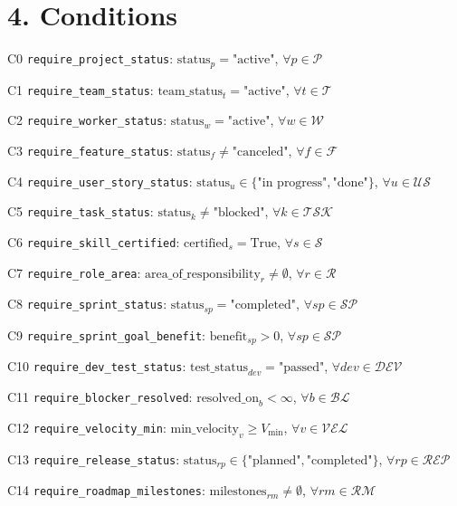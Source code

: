 \documentclass[12pt]{article}
\begin{document}
\section{4. Conditions}
\item[C0] \texttt{require\_project\_status}: $\text{status}_p = \text{"active"}$, $\forall p \in \mathcal{P}$
    \item[C1] \texttt{require\_team\_status}: $\text{team\_status}_t = \text{"active"}$, $\forall t \in \mathcal{T}$
    \item[C2] \texttt{require\_worker\_status}: $\text{status}_w = \text{"active"}$, $\forall w \in \mathcal{W}$
    \item[C3] \texttt{require\_feature\_status}: $\text{status}_f \neq \text{"canceled"}$, $\forall f \in \mathcal{F}$
    \item[C4] \texttt{require\_user\_story\_status}: $\text{status}_u \in \{\text{"in progress"}, \text{"done"}\}$, $\forall u \in \mathcal{US}$
    \item[C5] \texttt{require\_task\_status}: $\text{status}_k \neq \text{"blocked"}$, $\forall k \in \mathcal{TSK}$
    \item[C6] \texttt{require\_skill\_certified}: $\text{certified}_s = \text{True}$, $\forall s \in \mathcal{S}$
    \item[C7] \texttt{require\_role\_area}: $\text{area\_of\_responsibility}_r \neq \emptyset$, $\forall r \in \mathcal{R}$
    \item[C8] \texttt{require\_sprint\_status}: $\text{status}_{sp} = \text{"completed"}$, $\forall sp \in \mathcal{SP}$
    \item[C9] \texttt{require\_sprint\_goal\_benefit}: $\text{benefit}_{sp} > 0$, $\forall sp \in \mathcal{SP}$
    \item[C10] \texttt{require\_dev\_test\_status}: $\text{test\_status}_{dev} = \text{"passed"}$, $\forall dev \in \mathcal{DEV}$
    \item[C11] \texttt{require\_blocker\_resolved}: $\text{resolved\_on}_b < \infty$, $\forall b \in \mathcal{BL}$
    \item[C12] \texttt{require\_velocity\_min}: $\text{min\_velocity}_v \geq V_{\min}$, $\forall v \in \mathcal{VEL}$
    \item[C13] \texttt{require\_release\_status}: $\text{status}_{rp} \in \{\text{"planned"}, \text{"completed"}\}$, $\forall rp \in \mathcal{REP}$
    \item[C14] \texttt{require\_roadmap\_milestones}: $\text{milestones}_{rm} \neq \emptyset$, $\forall rm \in \mathcal{RM}$
\end{document}
